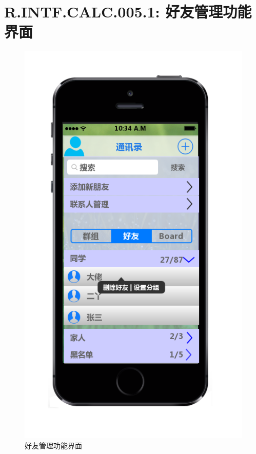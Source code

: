     \section{R.INTF.CALC.005.1: 好友管理功能界面}
    \begin{figure}[h]
        \centering
        \includegraphics[scale=0.6]{OutlineDesign/figures/好友管理功能界面.png}
        \caption{好友管理功能界面}
        \label{fig:server_flow}
    \end{figure}
    \newpage
